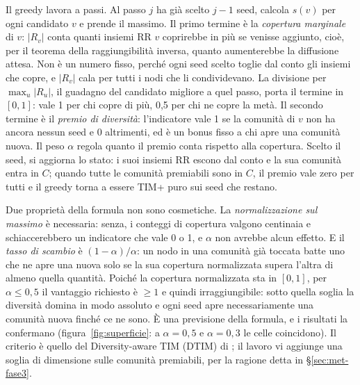 \documentclass[11pt,a4paper]{article}
\begin{document}
Il greedy lavora a passi. Al passo $j$ ha già scelto $j-1$ seed, calcola $s(v)$ per ogni candidato $v$ e prende il massimo. Il primo termine è la \emph{copertura marginale} di $v$: $|R_v|$ conta quanti insiemi RR $v$ coprirebbe in più se venisse aggiunto, cioè, per il teorema della raggiungibilità inversa, quanto aumenterebbe la diffusione attesa. Non è un numero fisso, perché ogni seed scelto toglie dal conto gli insiemi che copre, e $|R_v|$ cala per tutti i nodi che li condividevano. La divisione per $\max_u |R_u|$, il guadagno del candidato migliore a quel passo, porta il termine in $[0,1]$: vale 1 per chi copre di più, 0,5 per chi ne copre la metà. Il secondo termine è il \emph{premio di diversità}: l'indicatore vale 1 se la comunità di $v$ non ha ancora nessun seed e 0 altrimenti, ed è un bonus fisso a chi apre una comunità nuova. Il peso $\alpha$ regola quanto il premio conta rispetto alla copertura. Scelto il seed, si aggiorna lo stato: i suoi insiemi RR escono dal conto e la sua comunità entra in $C$; quando tutte le comunità premiabili sono in $C$, il premio vale zero per tutti e il greedy torna a essere TIM+ puro sui seed che restano.

Due proprietà della formula non sono cosmetiche. La \emph{normalizzazione sul massimo} è necessaria: senza, i conteggi di copertura valgono centinaia e schiaccerebbero un indicatore che vale 0 o 1, e $\alpha$ non avrebbe alcun effetto. E il \emph{tasso di scambio} è $(1-\alpha)/\alpha$: un nodo in una comunità già toccata batte uno che ne apre una nuova solo se la sua copertura normalizzata supera l'altra di almeno quella quantità. Poiché la copertura normalizzata sta in $[0, 1]$, per $\alpha \le 0{,}5$ il vantaggio richiesto è $\ge 1$ e quindi irraggiungibile: sotto quella soglia la diversità domina in modo assoluto e ogni seed apre necessariamente una comunità nuova finché ce ne sono. È una previsione della formula, e i risultati la confermano (figura~\ref{fig:superficie}: a $\alpha = 0{,}5$ e $\alpha = 0{,}3$ le celle coincidono). Il criterio è quello del Diversity-aware TIM (DTIM) di \citet{calio2018}; il lavoro vi aggiunge una soglia di dimensione sulle comunità premiabili, per la ragione detta in \S\ref{sec:met-fase3}.
\end{document}
